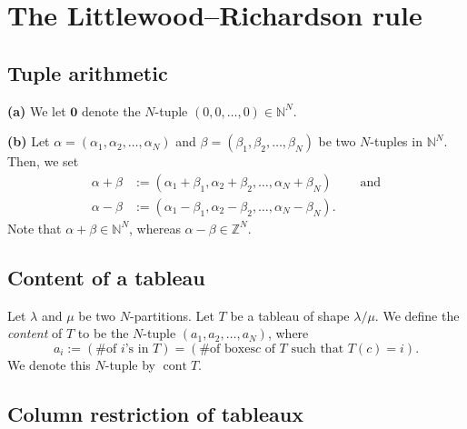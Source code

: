 \section{The Littlewood--Richardson rule}

\subsection{Tuple arithmetic}

\begin{definition}
\label{def.sf.tuple-addition}
\leantarget
\leanok
\textbf{(a)} We let $\mathbf{0}$ denote the
$N$-tuple $\left(  0,0,\ldots,0\right)  \in\mathbb{N}^{N}$.

\medskip

\textbf{(b)} Let $\alpha=\left(  \alpha_{1},\alpha_{2},\ldots,\alpha
_{N}\right)  $ and $\beta=\left(  \beta_{1},\beta_{2},\ldots,\beta_{N}\right)
$ be two $N$-tuples in $\mathbb{N}^{N}$. Then, we set%
\begin{align*}
\alpha+\beta &  :=\left(  \alpha_{1}+\beta_{1},\alpha_{2}+\beta_{2}%
,\ldots,\alpha_{N}+\beta_{N}\right)  \ \ \ \ \ \ \ \ \ \ \text{and}\\
\alpha-\beta &  :=\left(  \alpha_{1}-\beta_{1},\alpha_{2}-\beta_{2}%
,\ldots,\alpha_{N}-\beta_{N}\right)  .
\end{align*}
Note that $\alpha+\beta\in\mathbb{N}^{N}$, whereas $\alpha-\beta\in
\mathbb{Z}^{N}$.
\end{definition}

\subsection{Content of a tableau}

\begin{definition}
\label{def.sf.content}
\leantarget
\leanok
Let $\lambda$ and $\mu$ be two $N$-partitions. Let $T$
be a tableau of shape $\lambda/\mu$. We define the \emph{content} of $T$ to be
the $N$-tuple $\left(  a_{1},a_{2},\ldots,a_{N}\right)  $, where%
\[
a_{i}:=\left(  \text{\# of }i\text{'s in }T\right)  =\left(  \text{\# of boxes
}c\text{ of }T\text{ such that }T\left(  c\right)  =i\right)  .
\]
We denote this $N$-tuple by $\operatorname*{cont}T$.
\end{definition}

\subsection{Column restriction of tableaux}

